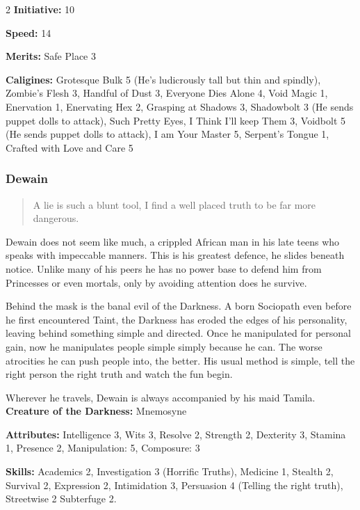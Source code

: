 \begin{multicols}{2}
\noindent \textbf{Initiative:} 10

\noindent \textbf{Speed:} 14

\noindent \textbf{Merits:} Safe Place 3

\noindent \textbf{Caligines:} Grotesque Bulk 5 (He's ludicrously tall but thin and spindly), Zombie's Flesh 3, Handful of Dust 3, Everyone Dies Alone 4, Void Magic 1, Enervation 1, Enervating Hex 2, Grasping at Shadows 3, Shadowbolt 3 (He sends puppet dolls to attack), Such Pretty Eyes, I Think I'll keep Them 3, Voidbolt 5 (He sends puppet dolls to attack), I am Your Master 5, Serpent's Tongue 1, Crafted with Love and Care 5

\subsubsection*{Dewain}

\begin{quote}A lie is such a blunt tool, I find a well placed truth to be far more dangerous.\end{quote}

Dewain does not seem like much, a crippled African man in his late teens who speaks with impeccable manners. This is his greatest defence, he slides beneath notice. Unlike many of his peers he has no power base to defend him from Princesses or even mortals, only by avoiding attention does he survive.

Behind the mask is the banal evil of the Darkness. A born Sociopath even before he first encountered Taint, the Darkness has eroded the edges of his personality, leaving behind something simple and directed. Once he manipulated for personal gain, now he manipulates people simple simply because he can. The worse atrocities he can push people into, the better. His usual method is simple, tell the right person the right truth and watch the fun begin.

Wherever he travels, Dewain is always accompanied by his maid Tamila.\\

\noindent \textbf{Creature of the Darkness:} Mnemosyne

\noindent \textbf{Attributes:} Intelligence 3, Wits 3, Resolve 2, Strength 2, Dexterity 3, Stamina 1, Presence 2, Manipulation: 5, Composure: 3

\noindent \textbf{Skills:} Academics 2, Investigation 3 (Horrific Truths), Medicine 1, Stealth 2, Survival 2, Expression 2, Intimidation 3, Persuasion 4 (Telling the right truth), Streetwise 2 Subterfuge 2.


\end{multicols}

